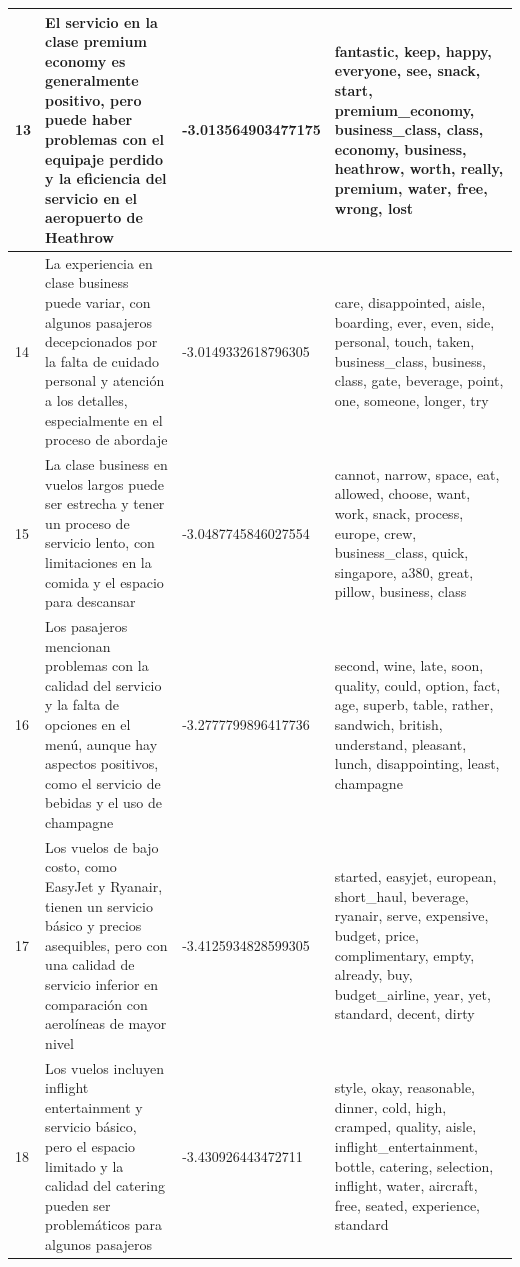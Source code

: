 \documentclass{report}
\begin{document}
{{\begin{longtable}{|p{1cm}|p{4cm}|p{4cm}|p{6cm}|}
                    \hline
                    13 & El servicio en la clase premium economy es generalmente positivo, pero puede haber problemas con el equipaje perdido y la eficiencia del servicio en el aeropuerto de Heathrow & -3.013564903477175 & fantastic, keep, happy, everyone, see, snack, start, premium\_economy, business\_class, class, economy, business, heathrow, worth, really, premium, water, free, wrong, lost \\
                    \hline
                    14 & La experiencia en clase business puede variar, con algunos pasajeros decepcionados por la falta de cuidado personal y atención a los detalles, especialmente en el proceso de abordaje & -3.0149332618796305 & care, disappointed, aisle, boarding, ever, even, side, personal, touch, taken, business\_class, business, class, gate, beverage, point, one, someone, longer, try \\
                    \hline
                    15 & La clase business en vuelos largos puede ser estrecha y tener un proceso de servicio lento, con limitaciones en la comida y el espacio para descansar & -3.0487745846027554 & cannot, narrow, space, eat, allowed, choose, want, work, snack, process, europe, crew, business\_class, quick, singapore, a380, great, pillow, business, class \\
                    \hline
                    16 & Los pasajeros mencionan problemas con la calidad del servicio y la falta de opciones en el menú, aunque hay aspectos positivos, como el servicio de bebidas y el uso de champagne & -3.2777799896417736 & second, wine, late, soon, quality, could, option, fact, age, superb, table, rather, sandwich, british, understand, pleasant, lunch, disappointing, least, champagne \\
                    \hline
                    17 & Los vuelos de bajo costo, como EasyJet y Ryanair, tienen un servicio básico y precios asequibles, pero con una calidad de servicio inferior en comparación con aerolíneas de mayor nivel & -3.4125934828599305 & started, easyjet, european, short\_haul, beverage, ryanair, serve, expensive, budget, price, complimentary, empty, already, buy, budget\_airline, year, yet, standard, decent, dirty \\
                    \hline
                    18 & Los vuelos incluyen inflight entertainment y servicio básico, pero el espacio limitado y la calidad del catering pueden ser problemáticos para algunos pasajeros & -3.430926443472711 & style, okay, reasonable, dinner, cold, high, cramped, quality, aisle, inflight\_entertainment, bottle, catering, selection, inflight, water, aircraft, free, seated, experience, standard \\

\end{longtable}}}
\end{document}
